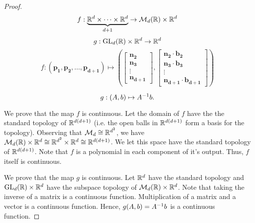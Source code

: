 \documentclass[letterpaper,titlepage]{article}
\begin{document}
\begin{proof}
        $$f:\underbrace{\mathbb{R}^d \times \dots \times \mathbb{R}^d}_{d+1} \to \mathcal{M}_{d}(\mathbb{R})\times \mathbb{R}^d$$
        $$g:\text{GL}_d(\mathbb{R})\times \mathbb{R}^d \to \mathbb{R}^d$$
        $$f:(\mathbf{p_1},\mathbf{p_2},\dots,\mathbf{p_{d+1}}) \mapsto \left(\begin{bmatrix}
            \mathbf{n_2}\\ \mathbf{n_3}\\ \vdots\\ \mathbf{n_{d+1}}
        \end{bmatrix},
        \begin{bmatrix}
            \mathbf{n_2}\cdot\mathbf{b_2} \\ \mathbf{n_3}\cdot\mathbf{b_3}\\ \vdots \\ \mathbf{n_{d+1}}\cdot\mathbf{b_{d+1}}
        \end{bmatrix}\right)$$
            
        $$g:(A,b) \mapsto A^{-1} b.$$
    
        We prove that the map $f$ is continuous. Let the domain of $f$ have the the standard topology of $\mathbb{R}^{d(d+1)}$ (i.e. the open balls in $\mathbb{R}^{d(d+1)}$ form a basis for the topology). Observing that $\mathcal{M}_{d} \cong \mathbb{R}^{d^2}$, we have $\mathcal{M}_{d}(\mathbb{R})\times \mathbb{R}^d \cong \mathbb{R}^{d^2}\times \mathbb{R}^d \cong \mathbb{R}^{d(d+1)}$. We let this space have the standard topology of $\mathbb{R}^{d(d+1)}$. Note that $f$ is a polynomial in each component of it's output. Thus, $f$ itself is continuous.

        We prove that the map $g$ is continuous. Let $\mathbb{R}^d$ have the standard topology and $\text{GL}_d(\mathbb{R})\times \mathbb{R}^d$ have the subspace topology of $\mathcal{M}_{d}(\mathbb{R})\times \mathbb{R}^d$. Note that taking the inverse of a matrix is a continuous function. Multiplication of a matrix and a vector is a continuous function. Hence, $g(A,b)=A^{-1} b$ is a continuous function.
        

\end{proof}
\end{document}
